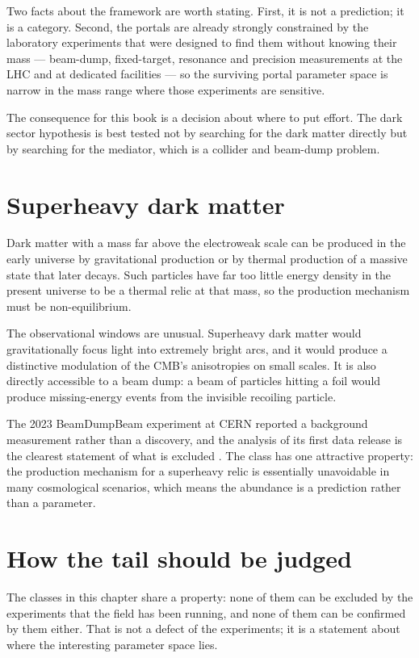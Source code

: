 Two facts about the framework are worth stating. First, it is not a
prediction; it is a category. Second, the portals are already strongly
constrained by the laboratory experiments that were designed to find them
without knowing their mass --- beam-dump, fixed-target, resonance and
precision measurements at the LHC and at dedicated facilities --- so the
surviving portal parameter space is narrow in the mass range where those
experiments are sensitive.

The consequence for this book is a decision about where to put effort. The
dark sector hypothesis is best tested not by searching for the dark matter
directly but by searching for the mediator, which is a collider and beam-dump
problem.

\section{Superheavy dark matter}Dark matter with a mass far above the electroweak scale
can be produced in the early universe by gravitational production or by
thermal production of a massive state that later decays. Such particles have
far too little energy density in the present universe to be a thermal
relic at that mass, so the production mechanism must be non-equilibrium.

The observational windows are unusual. Superheavy dark matter would
gravitationally focus light into extremely bright arcs, and it would
produce a distinctive modulation of the CMB's anisotropies on small scales.
It is also directly accessible to a beam dump: a beam of particles hitting
a foil would produce missing-energy events from the invisible recoiling
particle.

The 2023 BeamDumpBeam experiment at CERN reported a background measurement
rather than a discovery, and the analysis of its first data release is the
clearest statement of what is excluded . The
class has one attractive property: the production mechanism for a
superheavy relic is essentially unavoidable in many cosmological scenarios,
which means the abundance is a prediction rather than a parameter.

\section{How the tail should be judged}The classes in this chapter share a
property: none of them can be excluded by the experiments that the field has
been running, and none of them can be confirmed by them either. That is not
a defect of the experiments; it is a statement about where the interesting
parameter space lies.

